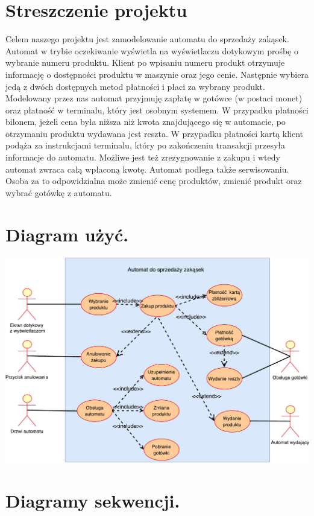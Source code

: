 \documentclass[11pt]{article}
\begin{document}
	\tableofcontents
	\cleardoublepage
	\setcounter{page}{2}
	
	\section{Streszczenie projektu}
		Celem naszego projektu jest zamodelowanie automatu do sprzedaży zakąsek.
		Automat w trybie oczekiwanie wyświetla na wyświetlaczu dotykowym prośbę o wybranie numeru produktu. Klient po wpisaniu numeru produkt otrzymuje informację o dostępności produktu w maszynie oraz jego cenie. Następnie wybiera jedą z dwóch dostępnych metod płatności i płaci za wybrany produkt. Modelowany przez nas automat przyjmuję zapłatę w gotówce (w postaci monet) oraz płatność w terminalu, który jest osobnym systemem. W przypadku płatności bilonem, jeżeli cena była niższa niż kwota znajdującego się w automacie, po otrzymaniu produktu wydawana jest reszta. W przypadku płatności kartą klient podąża za instrukcjami terminalu, który po zakończeniu transakcji przesyła informacje do automatu. Możliwe jest też zrezygnowanie z zakupu i wtedy automat zwraca całą wpłaconą kwotę. Automat podlega także serwisowaniu. Osoba za to odpowidzialna może zmienić cenę produktów, zmienić produkt oraz wybrać gotówkę z automatu.
	\newpage
    \section{Diagram użyć.}
		\begin{center}
			\includegraphics[scale=0.65]{UseCaseDiagram.pdf}
		\end{center}
		\newpage
	\section{Diagramy sekwencji.}
\end{document}
